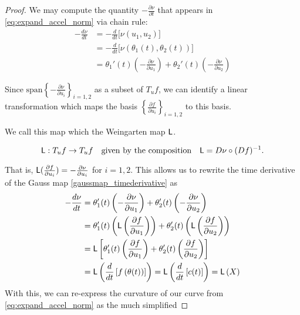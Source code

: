 \begin{proof}
  We may compute the quantity $-\frac{\partial \nu}{\partial t}$ that appears in
	\cref{eq:expand_accel_norm} via chain rule:
	\begin{align} \label{gaussmap_timederivative}
	-\frac{d \nu}{dt} &= -\frac{d}{dt}\big[\nu(u_1, u_2)\big] \nonumber \\
	&= -\frac{d}{dt}\big[\nu(\theta_1(t), \theta_2(t))\big] \nonumber \\
	&= \theta_1'(t)\left( - \frac{\partial \nu}{\partial u_1} \right) + 
	\theta_2'(t)\left( - \frac{\partial \nu}{\partial u_2} \right)
	\end{align}
	
	
	Since $\textrm{span}\left\{ - \frac{\partial \nu}{\partial u_i}\right\}_{i=1,2}$ as a subset of $T_u f$,  we can identify a linear transformation which maps the basis
	$\left\{ \frac{\partial f}{\partial u_i}\right\}_{i=1,2}$ to this basis.
  
  We call this map which the Weingarten map $\mathsf{L}$.
	
	\begin{defn} \label{def:wein-map}
		\[
		\mathsf{L}: T_u f \to T_u f 
		\quad \textrm{given by the composition} \quad
		\mathsf{L} = D\nu \circ (Df)^{-1}.
		\]
	\end{defn}
	That is, $\mathsf{L}(\frac{\partial f}{\partial u_i}) = - \frac{\partial \nu}{\partial u_i} $ for $i=1,2$.
  This allows us to rewrite the time derivative of the Gauss map \cref{gaussmap_timederivative} as
		\begin{align}
		-\frac{d \nu}{dt} &= 
		\theta_1'(t)\left( - \frac{\partial \nu}{\partial u_1} \right) + 
		\theta_2'(t)\left( - \frac{\partial \nu}{\partial u_2} \right) \nonumber\\
		&= \theta_1'(t)\left( \mathsf{L}\left(\frac{\partial f}{\partial u_1}\right) \right) + 
		\theta_2'(t)\left( \mathsf{L}\left(\frac{\partial f}{\partial u_2}\right) \right)\nonumber \\
		&= \mathsf{L}\left[\theta_1'(t)\left( \frac{\partial f}{\partial u_1}\right)  + 
		\theta_2'(t)\left( \frac{\partial f}{\partial u_2} \right)\right] \nonumber\\
		&= \mathsf{L}\left(\frac{d}{dt}\left[ f\left(\theta(t)\right)\right] \right)
		= \mathsf{L}\left( \frac{d}{dt} \left[ c(t) \right] \right) = \mathsf{L}\left(X\right)
		\end{align} 
		With this, we can re-express the curvature of our curve from
		\cref{eq:expand_accel_norm} as the much simplified
		

\end{proof}
